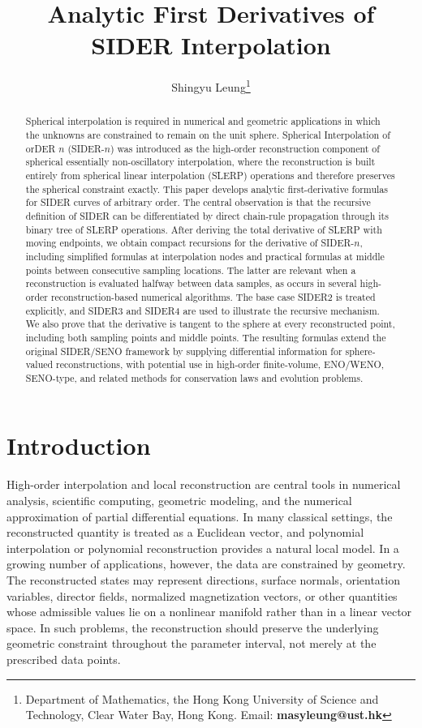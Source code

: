 \documentclass[a4paper,11pt]{article}
\title{Analytic First Derivatives of SIDER Interpolation}
\author{
Shingyu Leung\thanks{Department of Mathematics, the Hong Kong University of Science and Technology, Clear Water Bay, Hong Kong. Email: {\bf masyleung@ust.hk}}
}
\date{}
\numberwithin{equation}{section}
\theoremstyle{plain}
\theoremstyle{definition}
\theoremstyle{remark}
\begin{document}
\maketitle

\begin{abstract}
Spherical interpolation is required in numerical and geometric applications in which the unknowns are constrained to remain on the unit sphere.  Spherical Interpolation of orDER \(n\) (SIDER-\(n\)) was introduced as the high-order reconstruction component of spherical essentially non-oscillatory interpolation, where the reconstruction is built entirely from spherical linear interpolation (SLERP) operations and therefore preserves the spherical constraint exactly.  This paper develops analytic first-derivative formulas for SIDER curves of arbitrary order.  The central observation is that the recursive definition of SIDER can be differentiated by direct chain-rule propagation through its binary tree of SLERP operations.  After deriving the total derivative of SLERP with moving endpoints, we obtain compact recursions for the derivative of SIDER-\(n\), including simplified formulas at interpolation nodes and practical formulas at middle points between consecutive sampling locations.  The latter are relevant when a reconstruction is evaluated halfway between data samples, as occurs in several high-order reconstruction-based numerical algorithms.  The base case SIDER2 is treated explicitly, and SIDER3 and SIDER4 are used to illustrate the recursive mechanism.  We also prove that the derivative is tangent to the sphere at every reconstructed point, including both sampling points and middle points.  The resulting formulas extend the original SIDER/SENO framework by supplying differential information for sphere-valued reconstructions, with potential use in high-order finite-volume, ENO/WENO, SENO-type, and related methods for conservation laws and evolution problems.
\end{abstract}

\section{Introduction}

High-order interpolation and local reconstruction are central tools in numerical analysis, scientific computing, geometric modeling, and the numerical approximation of partial differential equations.  In many classical settings, the reconstructed quantity is treated as a Euclidean vector, and polynomial interpolation or polynomial reconstruction provides a natural local model.  In a growing number of applications, however, the data are constrained by geometry.  The reconstructed states may represent directions, surface normals, orientation variables, director fields, normalized magnetization vectors, or other quantities whose admissible values lie on a nonlinear manifold rather than in a linear vector space.  In such problems, the reconstruction should preserve the underlying geometric constraint throughout the parameter interval, not merely at the prescribed data points.
\end{document}
